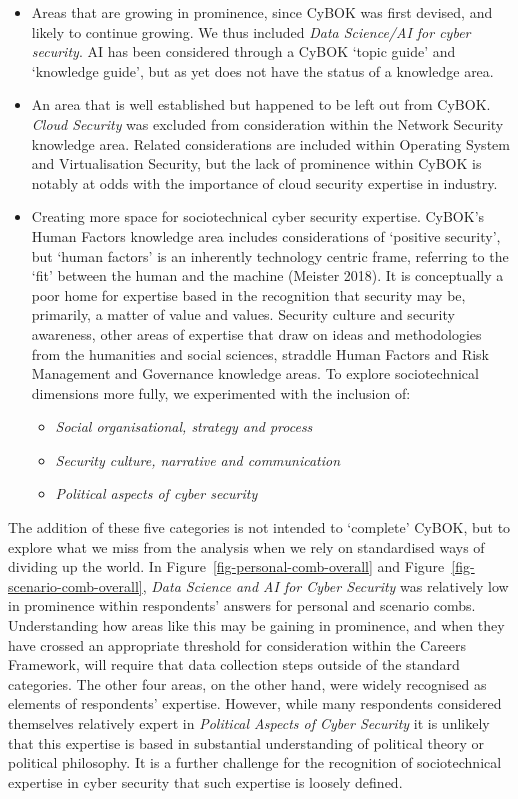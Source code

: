 \documentclass[
  a4paper,
]{book}
\begin{document}
\begin{itemize}
\item
  Areas that are growing in prominence, since CyBOK was first devised,
  and likely to continue growing. We thus included \emph{Data Science/AI
  for cyber security}. AI has been considered through a CyBOK `topic
  guide' and `knowledge guide', but as yet does not have the status of a
  knowledge area.
\item
  An area that is well established but happened to be left out from
  CyBOK. \emph{Cloud Security} was excluded from consideration within
  the Network Security knowledge area. Related considerations are
  included within Operating System and Virtualisation Security, but the
  lack of prominence within CyBOK is notably at odds with the importance
  of cloud security expertise in industry.
\item
  Creating more space for sociotechnical cyber security expertise.
  CyBOK's Human Factors knowledge area includes considerations of
  `positive security', but `human factors' is an inherently technology
  centric frame, referring to the `fit' between the human and the
  machine (Meister 2018). It is conceptually a poor home for expertise
  based in the recognition that security may be, primarily, a matter of
  value and values. Security culture and security awareness, other areas
  of expertise that draw on ideas and methodologies from the humanities
  and social sciences, straddle Human Factors and Risk Management and
  Governance knowledge areas. To explore sociotechnical dimensions more
  fully, we experimented with the inclusion of:

  \begin{itemize}
  \item
    \emph{Social organisational, strategy and process}
  \item
    \emph{Security culture, narrative and communication}
  \item
    \emph{Political aspects of cyber security}
  \end{itemize}
\end{itemize}

The addition of these five categories is not intended to `complete'
CyBOK, but to explore what we miss from the analysis when we rely on
standardised ways of dividing up the world. In
Figure~\ref{fig-personal-comb-overall} and
Figure~\ref{fig-scenario-comb-overall}, \emph{Data Science and AI for
Cyber Security} was relatively low in prominence within respondents'
answers for personal and scenario combs. Understanding how areas like
this may be gaining in prominence, and when they have crossed an
appropriate threshold for consideration within the Careers Framework,
will require that data collection steps outside of the standard
categories. The other four areas, on the other hand, were widely
recognised as elements of respondents' expertise. However, while many
respondents considered themselves relatively expert in \emph{Political
Aspects of Cyber Security} it is unlikely that this expertise is based
in substantial understanding of political theory or political
philosophy. It is a further challenge for the recognition of
sociotechnical expertise in cyber security that such expertise is
loosely defined.
\end{document}
